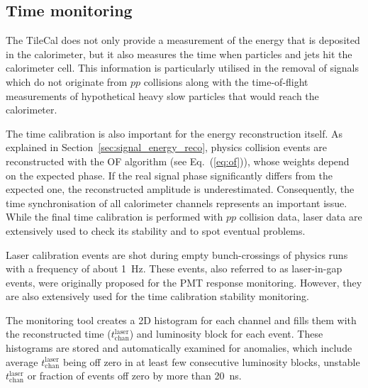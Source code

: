 
\subsection{Time monitoring}

\newcommand{\tlaser}{$t^{\mathrm{laser}}_{\mathrm{chan}}$}

The TileCal does not only provide a measurement of the energy that is
deposited in the calorimeter, but it also measures the time when
particles and jets hit the calorimeter cell. This information is
particularly utilised in the removal of signals which do not originate
from $pp$ collisions along with the time-of-flight
measurements of hypothetical heavy slow particles that would reach the
calorimeter.

The time calibration is also important for the energy reconstruction
itself. As explained in Section~\ref{sec:signal_energy_reco},
physics collision events are reconstructed with the OF algorithm (see
Eq.~(\ref{eq:of})), whose weights depend on the 
expected phase. If the real signal phase significantly differs from the
expected one, the reconstructed amplitude is underestimated. 
Consequently, the time synchronisation of all calorimeter channels
represents an important issue. While the final time calibration is performed
with $pp$ collision data, laser data are extensively used to check its
stability and to spot eventual problems.

Laser calibration events are shot during empty bunch-crossings of
physics runs with a frequency of about 1~Hz. These events, also
referred to as laser-in-gap events, were originally proposed for the
PMT response monitoring. However, they are also extensively used for the
time calibration stability monitoring.

The monitoring tool creates a 2D histogram for each channel and fills
them with the reconstructed time ({\tlaser}) and luminosity block for each
event. These histograms are stored and automatically examined for
anomalies, which include average {\tlaser} being off zero in at least
few consecutive luminosity blocks, unstable {\tlaser} or fraction of
events off zero by more than 20~ns.

